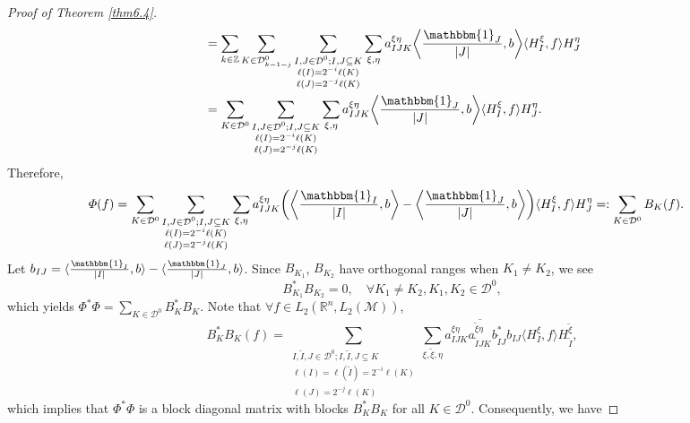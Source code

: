 \documentclass[oneside,english,a4wide]{amsart}
\numberwithin{equation}{section}
\numberwithin{figure}{section}
\theoremstyle{plain}
\theoremstyle{plain}
\theoremstyle{definition}
\theoremstyle{plain}
\theoremstyle{remark}
\theoremstyle{definition}
\theoremstyle{remark}
\theoremstyle{definition}
\newcommand{\8}{\infty}
\newcommand{\la}{\langle}
\begin{document}
\begin{proof}[Proof of Theorem \ref{thm6.4}]
\begin{equation*}
\begin{aligned}
			&=\sum_{k\in \mathbb{Z}}\sum_{K\in\mathcal{D}^0_{k-1-j}}\sum_{\substack{I,J\in\mathcal{D}^0;I,J\subseteq K\\ \ell(I)=2^{-i}\ell(K)\\\ell(J)=2^{-j}\ell(K)}}\sum_{\xi,\eta}a_{IJK}^{\xi\eta}\biggl\langle \frac{\mathbbm{1}_J}{|J|},b\biggr\rangle\langle H^\xi_I,f\rangle  H^\eta_J\\
			&=\sum_{K\in\mathcal{D}^0}\sum_{\substack{I,J\in\mathcal{D}^0;I,J\subseteq K\\ \ell(I)=2^{-i}\ell(K)\\\ell(J)=2^{-j}\ell(K)}}\sum_{\xi,\eta}a_{IJK}^{\xi\eta}\biggl\langle \frac{\mathbbm{1}_J}{|J|},b\biggr\rangle \langle H^\xi_I,f\rangle H^\eta_J.
		\end{aligned}
	\end{equation*}
	Therefore,
	\begin{equation}\label{BKdef}
		\begin{aligned}
			\varPhi(f){}&=\sum_{K\in\mathcal{D}^0}\sum_{\substack{I,J\in\mathcal{D}^0;I,J\subseteq K\\ \ell(I)=2^{-i}\ell(K)\\\ell(J)=2^{-j}\ell(K)}}\sum_{\xi,\eta}a_{IJK}^{\xi\eta}\biggl(\biggl\langle \frac{\mathbbm{1}_I}{|I|},b\biggr\rangle-\biggl\langle \frac{\mathbbm{1}_J}{|J|},b\biggr\rangle\biggr)\langle H^\xi_I,f\rangle H^\eta_J
			=:\sum_{K\in\mathcal{D}^0}B_K(f).
		\end{aligned}
	\end{equation}
	Let $b_{IJ}= \langle \frac{\mathbbm{1}_I}{|I|},b\rangle-\langle \frac{\mathbbm{1}_J}{|J|},b\rangle$.
	Since $B_{K_1}$, $B_{K_2}$ have orthogonal ranges when $K_1\neq K_2$, we see
	\[B_{K_1}^*B_{K_2}=0,\quad \forall K_1\neq K_2, K_1,K_2\in\mathcal{D}^0,\]
	which yields $\varPhi^*\varPhi=\sum\limits_{K\in \mathcal{ D}^0}B_K^*B_K$.
	Note that $\forall f\in L_2(\mathbb{R}^n,L_2(\mathcal{M}))$, 
	\begin{equation}\label{BkBK}
		B_K^*B_K(f)=\sum_{\substack{I,\tilde{I},J\in\mathcal{D}^0;I,\tilde{I},J\subseteq K\\ \ell(I)=\ell(\tilde{I})=2^{-i}\ell(K)\\\ell(J)=2^{-j}\ell(K)}}\sum_{\xi,\tilde{\xi},\eta}a_{IJK}^{\xi\eta}\overline{a_{\tilde{I}JK}^{\tilde{\xi}\eta}}b_{\tilde{I}J}^* b_{IJ}\la H^\xi_I,f\rangle H^{\tilde{\xi}}_{\tilde{I}},
	\end{equation}   
	which implies that $\varPhi^*\varPhi$ is a block diagonal matrix with blocks $B_K^*B_K$ for all $K\in \mathcal{ D}^0$.
	Consequently, we have

\end{proof}
\end{document}
